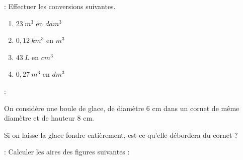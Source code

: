  : Effectuer les conversions suivantes.

\begin{multicols}{4}
	\begin{enumerate}[label=\alph*.]
		\item $23~m^3$ en $dam^3$  \vspace*{13em}
		\item $0,12~km^3$ en $m^3$ \vspace*{13em}
		\item $43~L$ en $cm^3$ \vspace*{13em}
		\item $0,27~m^3$ en $dm^3$ \vspace*{13em}
	\end{enumerate}
\end{multicols}

 : 

On considère une boule de glace, de diamètre 6 cm dans un cornet de même diamètre et de hauteur 8 cm.

Si on laisse la glace fondre entièrement, est-ce qu'elle débordera du cornet ?

\newpage

 : Calculer les aires des figures suivantes :

